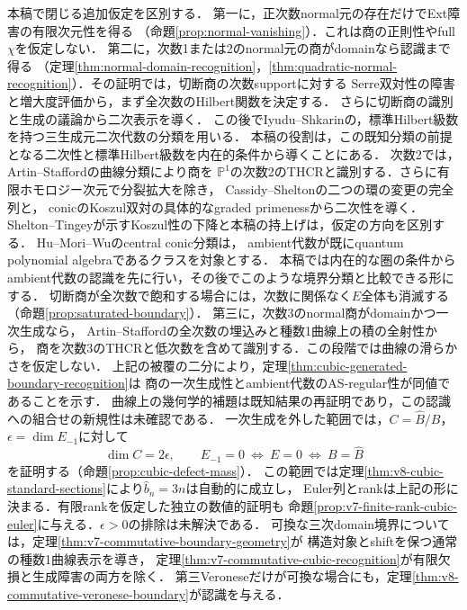 \documentclass[11pt,a4paper]{ltjsarticle}
\begin{document}
本稿で閉じる追加仮定を区別する．
第一に，正次数normal元の存在だけでExt障害の有限次元性を得る
（命題\ref{prop:normal-vanishing}）．これは商の正則性やfull $\chi$を仮定しない．
第二に，次数1または2のnormal元の商がdomainなら認識まで得る
（定理\ref{thm:normal-domain-recognition}，\ref{thm:quadratic-normal-recognition}）．その証明では，切断商の次数supportに対する
Serre双対性の障害と増大度評価から，まず全次数のHilbert関数を決定する．
さらに切断商の識別と生成の議論から二次表示を導く．
この後でIyudu--Shkarin\cite[\S12.1]{IS}の，標準Hilbert級数を持つ三生成元二次代数の分類を用いる．
本稿の役割は，この既知分類の前提となる二次性と標準Hilbert級数を内在的条件から導くことにある．
次数2では，Artin--Stafford\cite[Theorem 0.2]{ASquadratic}の曲線分類により商を
$\mathbb P^1$の次数2のTHCRと識別する．さらに有限ホモロジー次元で分裂拡大を除き，
Cassidy--Shelton\cite[\S6, (6.1)--(6.2)]{CassidyShelton}の二つの環の変更の完全列と，
conicのKoszul双対の具体的なgraded primenessから二次性を導く．
Shelton--Tingey\cite{SheltonTingey}が示すKoszul性の下降と本稿の持上げは，仮定の方向を区別する．
Hu--Mori--Wu\cite[Definitions 1.1--1.2]{HuMoriWu}のcentral conic分類は，
ambient代数が既にquantum polynomial algebraであるクラスを対象とする．
本稿では内在的な圏の条件からambient代数の認識を先に行い，その後でこのような境界分類と比較できる形にする．
切断商が全次数で飽和する場合には，次数に関係なく$E$全体も消滅する
（命題\ref{prop:saturated-boundary}）．
第三に，次数3のnormal商がdomainかつ一次生成なら，
Artin--Staffordの全次数の埋込みと種数1曲線上の積の全射性から，
商を次数3のTHCRと低次数を含めて識別する．この段階では曲線の滑らかさを仮定しない．
上記の被覆の二分により，定理\ref{thm:cubic-generated-boundary-recognition}は
商の一次生成性とambient代数のAS-regular性が同値であることを示す．
曲線上の幾何学的補題は既知結果の再証明であり，この認識への組合せの新規性は未確認である．
一次生成を外した範囲では，$C=\widehat B/B$，$\epsilon=\dim E_{-1}$に対して
\[
 \dim C=2\epsilon,
 \qquad E_{-1}=0\ \Longleftrightarrow\ E=0\ \Longleftrightarrow\ B=\widehat B
\]
を証明する（命題\ref{prop:cubic-defect-mass}）．
この範囲では定理\ref{thm:v8-cubic-standard-sections}により$\widehat b_n=3n$は自動的に成立し，
Euler列とrankは上記の形に決まる．有限rankを仮定した独立の数値的証明も
命題\ref{prop:v7-finite-rank-cubic-euler}に与える．$\epsilon>0$の排除は未解決である．
可換な三次domain境界については，定理\ref{thm:v7-commutative-boundary-geometry}が
構造対象とshiftを保つ通常の種数1曲線表示を導き，
定理\ref{thm:v7-commutative-cubic-recognition}が有限欠損と生成障害の両方を除く．
第三Veroneseだけが可換な場合にも，定理\ref{thm:v8-commutative-veronese-boundary}が認識を与える．
\end{document}
